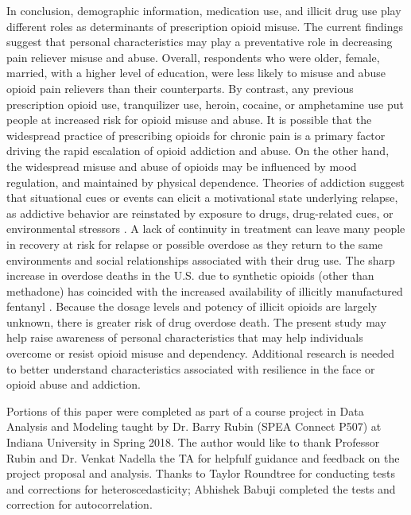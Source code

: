 \documentclass[sigconf]{acmart}
\begin{document}
In conclusion, demographic information, medication use, and illicit drug use 
play different roles as determinants of prescription opioid misuse. The current
findings suggest that personal characteristics may play a preventative role 
in decreasing pain reliever misuse and abuse. Overall, respondents who were 
older, female, married, with a higher level of education, were less likely to 
misuse and abuse opioid pain relievers than their counterparts. By contrast, 
any previous prescription opioid use, tranquilizer use, heroin, cocaine, or
amphetamine use put people at increased risk for opioid misuse and abuse. It is 
possible that the widespread practice of prescribing opioids for chronic pain 
is a primary factor driving the rapid escalation of opioid addiction and abuse. 
On the other hand, the widespread misuse and abuse of opioids may be 
influenced by mood regulation, and maintained by physical dependence. Theories 
of addiction suggest that situational cues or events can elicit a motivational 
state underlying relapse, as addictive behavior are reinstated by exposure to 
drugs, drug-related cues, or environmental stressors \cite{shaham03}. A lack of 
continuity in treatment can leave many people in recovery at risk for relapse 
or possible overdose as they return to the same environments and social 
relationships associated with their drug use. The sharp increase in overdose 
deaths in the U.S. due to synthetic opioids (other than methadone) has coincided 
with the increased availability of illicitly manufactured fentanyl \cite{nida17}. 
Because the dosage levels and potency of illicit opioids are largely unknown, 
there is greater risk of drug overdose death. The present study may help
raise awareness of personal characteristics that may help individuals overcome 
or resist opioid misuse and dependency. Additional research is needed to better 
understand characteristics associated with resilience in the face or opioid 
abuse and addiction. 



\begin{acks}

Portions of this paper were completed as part of a course project in Data 
Analysis and Modeling taught by Dr. Barry Rubin (SPEA Connect P507) at 
Indiana University in Spring 2018. The author would like to thank Professor 
Rubin and Dr. Venkat Nadella the TA for helpfulf guidance and feedback on 
the project proposal and analysis. Thanks to Taylor Roundtree for conducting
tests and corrections for heteroscedasticity; Abhishek Babuji completed 
the tests and correction for autocorrelation.

\end{acks}

 
\end{document}
